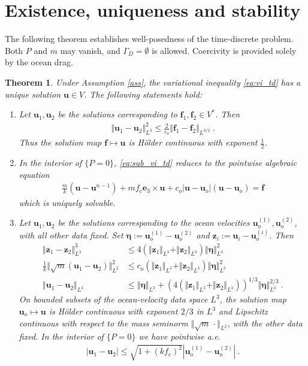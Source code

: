 \documentclass{article}
\newtheorem{theorem}{Theorem}[section]
\theoremstyle{definition}
\newcommand{\bfu}{\boldsymbol{u}}
\newcommand{\bfe}{\boldsymbol{e}}
\newcommand{\bff}{\boldsymbol{f}}
\newcommand{\bfeta}{\boldsymbol{\eta}}
\newcommand{\bfz}{\boldsymbol{z}}
\begin{document}
\section{Existence, uniqueness and stability}
The following theorem establishes well-posedness of the time-discrete
problem. Both $P$ and $m$ may vanish, and $\Gamma_D=\emptyset$ is allowed.
Coercivity is provided solely by the ocean drag.
\begin{theorem}\label{th:td}
    Under Assumption \ref{ass}, the variational inequality \eqref{eq:vi_td} has a unique solution $\bfu \in V$. The following statements hold:
    \begin{enumerate}
        \item Let $\bfu_1, \bfu_2$ be the solutions corresponding to $\bff_1,\bff_2\in V^*$. Then
        \begin{align*}
            \Vert \bfu_1 -\bfu_2\Vert_{L^3}^2 \leq \frac{2}{c_o} \Vert \bff_1-\bff_2\Vert_{L^{3/2}} \ .
        \end{align*}
        Thus the solution map $\bff \mapsto \bfu$ is H\"older continuous with exponent $\frac 1 2$.
    \item In the interior of $\{P=0\}$, \eqref{eq:sub_vi_td} reduces to the pointwise algebraic
    equation
    \begin{align*}
        \frac m k (\bfu - \bfu^{n-1}) + m f_c \bfe_3 \times \bfu + c_o |\bfu-\bfu_o|(\bfu-\bfu_o) = \bff
    \end{align*}
    which is uniquely solvable.
    \item Let $\bfu_1,\bfu_2$ be the solutions corresponding to the ocean
    velocities $\bfu_o^{(1)},\bfu_o^{(2)}$, with all other data fixed. Set
    $\bfeta:=\bfu_o^{(1)}-\bfu_o^{(2)}$ and $\bfz_i:=\bfu_i-\bfu_o^{(i)}$.
    Then
    \begin{align}
        \Vert\bfz_1-\bfz_2\Vert_{L^{3}}^3 &\leq
        4 (\Vert\bfz_1\Vert_{L^3}+\Vert\bfz_2\Vert_{L^3})\Vert\bfeta\Vert_{L^3}^2\label{eq:first_uo}\\
        \frac{1}{k}\Vert\sqrt{m}(\bfu_1-\bfu_2)\Vert^2_{L^2}
        &\leq c_o(\Vert\bfz_1\Vert_{L^3}+\Vert\bfz_2\Vert_{L^3})\Vert\bfeta\Vert^2_{L^3}\label{eq:second_uo}\\
        \Vert\bfu_1-\bfu_2\Vert_{L^3}&\leq \Vert\bfeta\Vert_{L^3} +(4(\Vert\bfz_1\Vert_{L^3}+\Vert\bfz_2\Vert_{L^3}))^{1/3}\Vert\bfeta\Vert_{L^3}^{2/3} \ . \label{eq:third_uo}
    \end{align}
    On bounded subsets of the ocean-velocity data space $L^3$, the solution
    map $\bfu_o\mapsto\bfu$ is H\"older continuous with exponent $2/3$ in
    $L^3$ and Lipschitz continuous with respect to the mass seminorm
    $\Vert\sqrt m\,\cdot\Vert_{L^2}$, with the other data fixed.
    In the interior of $\{P=0\}$ we have pointwise a.e.
    \begin{align*}
        |\bfu_1-\bfu_2|\leq \sqrt{1+(kf_c)^2}|\bfu_o^{(1)}-\bfu_o^{(2)}| \ .
    \end{align*}
    \end{enumerate}
\end{theorem}
\end{document}
